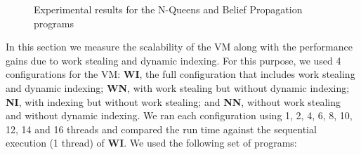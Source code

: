 \begin{figure}[ht]
\centering
{}
\hspace{0.5cm}
\caption{Experimental results for the N-Queens and Belief Propagation programs}
\end{figure}

In this section we measure the scalability of the VM along with the
performance gains due to work stealing and dynamic indexing.  For
this purpose, we used 4 configurations for the VM: \textbf{WI}, the
full configuration that includes work stealing and dynamic indexing;
\textbf{WN}, with work stealing but without dynamic
indexing; \textbf{NI}, with indexing but without work stealing; and
\textbf{NN}, without work stealing and without dynamic indexing.  We
ran each configuration using 1, 2, 4, 6, 8, 10, 12, 14 and 16 threads
and compared the run time against the sequential execution (1 thread)
of \textbf{WI}. We used the following set of programs:

